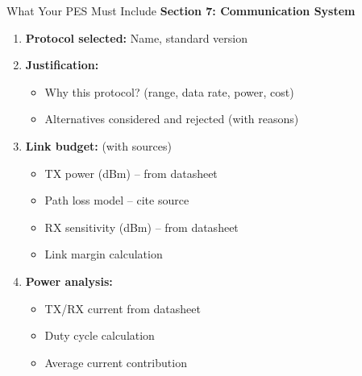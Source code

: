 \documentclass[aspectratio=169,11pt]{beamer}
\begin{document}
\begin{frame}{What Your PES Must Include}
    \textbf{Section 7: Communication System}
    
    \vspace{0.3cm}
    \begin{enumerate}
        \item \textbf{Protocol selected:} Name, standard version
        
        \item \textbf{Justification:}
        \begin{itemize}
            \item Why this protocol? (range, data rate, power, cost)
            \item Alternatives considered and rejected (with reasons)
        \end{itemize}
        
        \item \textbf{Link budget:} (with sources)
        \begin{itemize}
            \item TX power (dBm) -- from datasheet
            \item Path loss model -- cite source
            \item RX sensitivity (dBm) -- from datasheet
            \item Link margin calculation
        \end{itemize}
        
        \item \textbf{Power analysis:}
        \begin{itemize}
            \item TX/RX current from datasheet
            \item Duty cycle calculation
            \item Average current contribution
        \end{itemize}
    \end{enumerate}
\end{frame}
\end{document}
